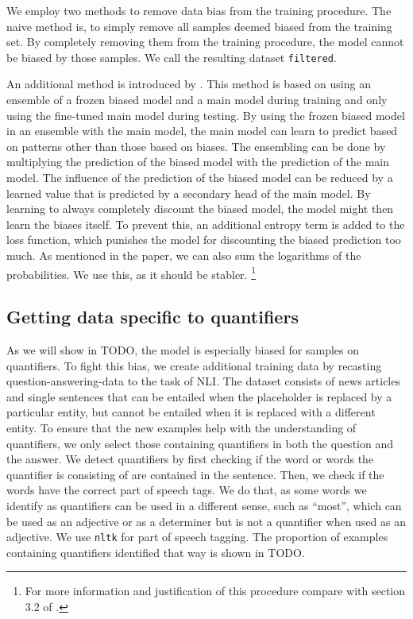 We employ two methods to remove data bias from the training procedure. The naive method is, to simply remove all samples deemed biased from the training set. By completely removing them from the training procedure, the model cannot be biased by those samples. We call the resulting dataset \texttt{filtered}.

An additional method is introduced by \citet{ensemble}. This method is based on using an ensemble of a frozen biased model and a main model during training and only using the fine-tuned main model during testing. By using the frozen biased model in an ensemble with the main model, the main model can learn to predict based on patterns other than those based on biases. The ensembling can be done by multiplying the prediction of the biased model with the prediction of the main model. The influence of the prediction of the biased model can be reduced by a learned value that is predicted by a secondary head of the main model. By learning to always completely discount the biased model, the model might then learn the biases itself. To prevent this, an additional entropy term is added to the loss function, which punishes the model for discounting the biased prediction too much. As mentioned in the paper, we can also sum the logarithms of the probabilities. We use this, as it should be stabler. \footnote{For more information and justification of this procedure compare with section 3.2 of \cite{ensemble}.}

\subsection{Getting data specific to quantifiers} \label{sec:meth:recasting}

As we will show in TODO, the model is especially biased for samples on quantifiers. To fight this bias, we create additional training data by recasting question-answering-data to the task of \ac{NLI}. The dataset consists of news articles and single sentences that can be entailed when the placeholder is replaced by a particular entity, but cannot be entailed when it is replaced with a different entity. To ensure that the new examples help with the understanding of quantifiers, we only select those containing quantifiers in both the question and the answer. We detect quantifiers by first checking if the word or words the quantifier is consisting of are contained in the sentence. Then, we check if the words have the correct part of speech tags. We do that, as some words we identify as quantifiers can be used in a different sense, such as \enquote{most}, which can be used as an adjective or as a determiner but is not a quantifier when used as an adjective. We use \texttt{nltk} \cite{nltk} for part of speech tagging. The proportion of examples containing quantifiers identified that way is shown in TODO.

